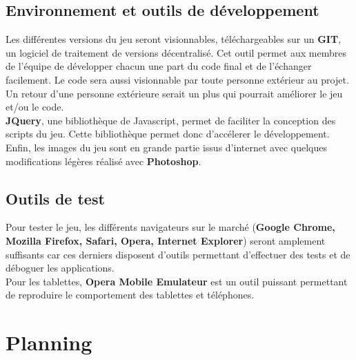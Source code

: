 \documentclass{article}
\begin{document}
\subsection{Environnement et outils de d\'eveloppement}

\hspace*{0.6cm}Les diff\'erentes versions du jeu seront visionnables, t\'el\'echargeables sur un \textbf{GIT}, un logiciel de traitement de versions d\'ecentralis\'e. Cet outil permet aux membres de l'\'equipe de d\'evelopper chacun une part du code final et de l'\'echanger facilement. Le code sera aussi visionnable par toute personne ext\'erieur au projet. Un retour d'une personne ext\'erieure serait un plus qui pourrait am\'eliorer le jeu et/ou le code.
\vspace{0.5cm}\\
\hspace*{0.6cm}\textbf{JQuery}, une biblioth\`eque de Javascript, permet de faciliter la conception des scripts du jeu. Cette biblioth\`eque permet donc d'acc\'elerer le d\'eveloppement.
\vspace{0.5cm}\\
\hspace*{0.6cm}Enfin, les images du jeu sont en grande partie issus d'internet avec quelques modifications l\'eg\`eres r\'ealis\'e avec \textbf{Photoshop}. 

\subsection{Outils de test}
\hspace*{0.6cm}Pour tester le jeu, les diff\'erents navigateurs sur le march\'e (\textbf{Google Chrome, Mozilla Firefox, Safari, Opera, Internet Explorer}) seront amplement suffisants car ces derniers disposent d'outils permettant d'effectuer des tests et de d\'eboguer les applications.\\
\hspace*{0.6cm}Pour les tablettes, \textbf{Opera Mobile Emulateur} est un outil puissant permettant de reproduire le comportement des tablettes et t\'el\'ephones.\\

\section{Planning}
\end{document}
